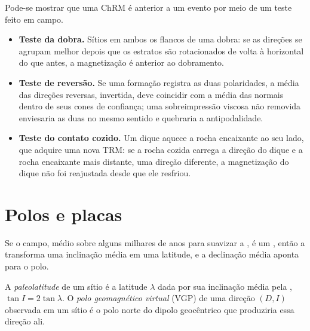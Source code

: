 \begin{method}\label{met:b3:palaeomagnetism:tests}
Pode-se mostrar que uma ChRM é anterior a um evento por meio de um teste feito em campo.
\begin{itemize}
  \item \textbf{Teste da dobra.} Sítios em ambos os flancos de uma dobra: se as direções
        se agrupam melhor depois que os estratos são rotacionados de volta à horizontal do que
        antes, a magnetização é anterior ao dobramento.
  \item \textbf{Teste de reversão.} Se uma formação registra as duas polaridades, a média
        das direções reversas, invertida, deve coincidir com a média das
        normais dentro de seus cones de confiança; uma sobreimpressão viscosa não
        removida enviesaria as duas no mesmo sentido e quebraria a antipodalidade.
  \item \textbf{Teste do contato cozido.} Um dique aquece a rocha encaixante ao
        seu lado, que adquire uma nova TRM: se a rocha cozida carrega a direção do dique
        e a rocha encaixante mais distante, uma direção diferente, a magnetização do dique
        não foi reajustada desde que ele resfriou.
\end{itemize}
\end{method}

\section{Polos e placas}

Se o campo, médio sobre alguns milhares de anos para suavizar a , é um , então a  transforma uma
inclinação média em uma latitude, e a declinação média aponta para o polo.

\begin{definition}\label{def:b3:palaeomagnetism:vgp}
A \emph{paleolatitude} de um sítio é a latitude
$\lambda$ dada por sua inclinação média pela , $\tan I =
2\tan\lambda$. O \emph{polo geomagnético virtual}
(VGP) de uma direção $(D, I)$ observada em um sítio é o polo norte do
dipolo geocêntrico que produziria essa direção ali.
\end{definition}

